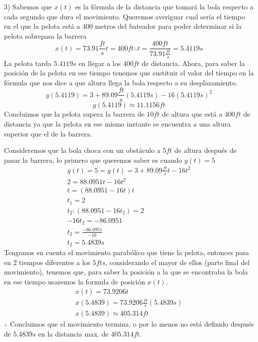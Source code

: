     3) Sabemos que $x(t)$ es la fórmula de la distancia que tomará la bola respecto a cada segundo que dura el movimiento. Queremos averiguar cual sería el tiempo en el que la pelota está a 400 metros del bateador para poder determinar si la pelota sobrepasa la barrera
    $$x(t)=73.91\frac{ft}{s}t=400ft\therefore t=\frac{400ft}{73.91\frac{ft}{s}}=5.4119s$$
    La pelota tarda $5.4119s$ en llegar a los $400 ft$ de distancia.
    Ahora, para saber la posición de la pelota en ese tiempo tenemos que sustituir el valor del tiempo en la fórmula que nos dice a que altura llega la bola respecto a su desplazamiento.
    $$y(5.4119)=3+89.09\frac{ft}{s}(5.4119s)-16(5.4119s)^2$$
        $$y(5.4119) \simeq 11.1156ft$$
    Concluimos que la pelota supera la barrera de $10ft$ de altura que está a $400 ft$ de distancia ya que la pelota en ese mismo instante se encuentra a una altura superior que el de la barrera.
    
    \vspace{5mm} %
    
    Consideremos que la bola choca con un obstáculo a $5ft$ de altura después de pasar la barrera, lo primero que queremos saber es cuando $y(t)=5$
    \begin{gather*}
        y(t)=5=y(t)=3+89.09\frac{ft}{s}t-16t^2\\
        2=88.0951t-16t^2\\
        t=(88.0951-16t)t\\
        t_1=2\\
        t_2:(88.0951-16t_2)=2\\
        -16t_2=-86.0951\\
        t_2=\frac{-86.0951}{-16}\\
        t_2=5.4839s
    \end{gather*}
    Tengamos en cuenta el movimiento parabólico que tiene la pelota, entonces pasa en 2 tiempos diferentes a los $5 fts$, considerando el mayor de ellos (parte final del movimiento), tenemos que, para saber la posición a la que se encontraba la bola en ese tiempo usaremos la formula de posición $x(t)$.
    \begin{gather*}
        x(t)=73.9206t\\
        x(5.4839)=73.9206\frac{ft}{s}(5.4839s)\\
        x(5.4839)\simeq405.314ft
    \end{gather*}
    $\therefore$ Concluimos que el movimiento termina, o por lo menos no está definido después de $5.4839s$ en la distancia max. de $405.314ft$.
    
